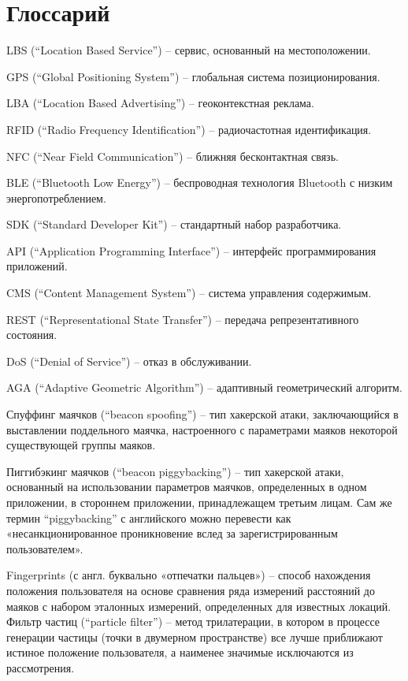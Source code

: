 \section{Глоссарий}

LBS (“Location Based Service”) – сервис, основанный на местоположении.

GPS (“Global Positioning System”) – глобальная система позиционирования.

LBA (“Location Based Advertising”) – геоконтекстная реклама.

RFID (“Radio Frequency Identification”) – радиочастотная идентификация.

NFC (“Near Field Communication”) – ближняя бесконтактная связь.

BLE (“Bluetooth Low Energy”) – беспроводная технология Bluetooth с низким энергопотреблением.

SDK (“Standard Developer Kit”) – стандартный набор разработчика.

API (“Application Programming Interface”) – интерфейс программирования приложений.

CMS (“Content Management System”) – система управления содержимым.

REST (“Representational State Transfer”) – передача репрезентативного состояния.

DoS (“Denial of Service”) – отказ в обслуживании.

AGA (“Adaptive Geometric Algorithm”) – адаптивный геометрический алгоритм.

Спуффинг маячков (“beacon spoofing”) – тип хакерской атаки, заключающийся в выставлении поддельного маячка, настроенного с параметрами маяков некоторой существующей группы маяков.

Пиггибэкинг маячков (“beacon piggybacking”) – тип хакерской атаки, основанный на использовании параметров маячков, определенных в одном приложении, в стороннем приложении, принадлежащем третьим лицам. Сам же термин “piggybacking” с английского можно перевести как «несанкционированное проникновение вслед за зарегистрированным пользователем».

Fingerprints (с англ. буквально «отпечатки пальцев») – способ нахождения положения пользователя на основе сравнения ряда измерений расстояний до маяков с набором эталонных измерений, определенных для известных локаций. \\

Фильтр частиц (“particle filter”) – метод трилатерации, в котором в процессе генерации частицы (точки в двумерном пространстве) все лучше приближают истиное положение пользователя, а наименее значимые исключаются из рассмотрения.

